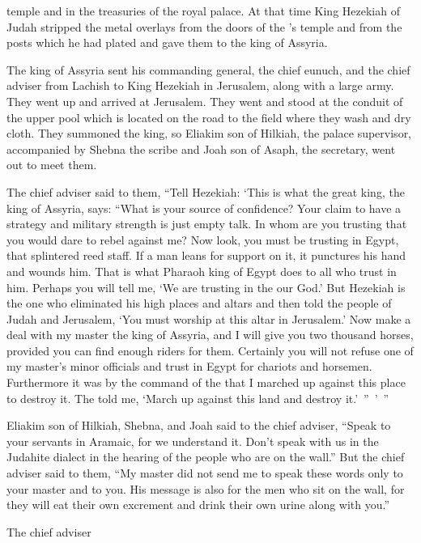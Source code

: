 {temple
and in the treasuries
of the royal
palace.
At that time
King
Hezekiah
of Judah
stripped
the metal overlays from the doors
of the
{}’s
temple
and from the posts
which
he
had plated
and gave
them to the king
of Assyria.
\par }{\PP {}The king
of Assyria
sent
his commanding general,
the
chief eunuch,
and the
chief adviser
from
Lachish
to
King
Hezekiah
in Jerusalem,
along with a large
army.
They went up
and arrived at
Jerusalem.
They went
and stood
at the conduit
of the upper
pool
which
is located on the road
to the field
where they wash and dry cloth.
They summoned
the king,
so
Eliakim
son
of Hilkiah,
the palace
supervisor,
accompanied by Shebna
the scribe
and Joah
son
of Asaph,
the secretary,
went out
to
meet them.
\par }{\PP {}The chief adviser
said
to
them, “Tell
Hezekiah: ‘This is what
the great
king,
the king
of Assyria,
says: “What
is your source of confidence?
Your claim
to have a strategy
and military
strength
is just empty talk.
In
whom
are you trusting
that
you would dare to rebel against me?
Now
look,
you must be
trusting
in Egypt,
that
splintered
reed
staff.
If a man
leans
for support
on
it, it punctures
his hand
and wounds him. That is what
Pharaoh
king
of Egypt
does to all
who trust
in him.
Perhaps
you will tell
me,
‘We are trusting
in the
{}
our God.’
But
Hezekiah
is
the one
who
eliminated
his high places
and altars
and then told
the people of Judah
and Jerusalem,
‘You must worship
at this
altar
in Jerusalem.’
Now
make a deal
with
my master
the king
of Assyria,
and I will give
you two thousand
horses,
provided you can
find enough riders for them.
Certainly
you will not refuse
one
of my master’s
minor
officials
and trust
in
Egypt
for chariots
and horsemen.
Furthermore
it was by the command of the
{}
that I marched up
against
this
place
to destroy
it. The
{}
told
me, ‘March up
against
this
land
and destroy it.’ ” ’ ”
\par }{\PP {}Eliakim
son
of Hilkiah,
Shebna,
and Joah
said to
the chief adviser,
“Speak
to
your servants
in Aramaic,
for
we
understand
it. Don’t
speak
with
us in the Judahite dialect
in the hearing
of the people
who
are on
the wall.”
But the chief adviser
said
to
them, “My master
did not send
me to
speak
these
words
only to your master
and to you. His message is also
for
the men
who sit
on
the wall,
for they will eat
their own excrement
and drink
their own urine
along with you.”
\par }{\PP {}The chief adviser
}
